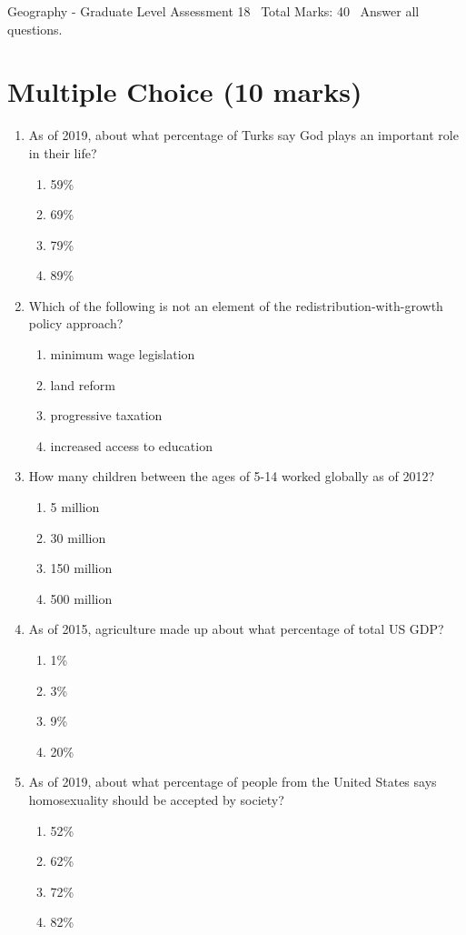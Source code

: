 \documentclass[12pt]{article}
\begin{document}
\begin{center}
Geography - Graduate Level Assessment 18 \
Total Marks: 40 \
Answer all questions.
\end{center}

\section*{Multiple Choice (10 marks)}
\begin{enumerate}[label=\arabic*.]
\item As of 2019, about what percentage of Turks say God plays an important role in their life?
\begin{enumerate}[label=(\alph*)]
    \item 59\%
    \item 69\%
    \item 79\%
    \item 89\%
\end{enumerate}
\item Which of the following is not an element of the redistribution-with-growth policy approach?
\begin{enumerate}[label=(\alph*)]
    \item minimum wage legislation
    \item land reform
    \item progressive taxation
    \item increased access to education
\end{enumerate}
\item How many children between the ages of 5-14 worked globally as of 2012?
\begin{enumerate}[label=(\alph*)]
    \item 5 million
    \item 30 million
    \item 150 million
    \item 500 million
\end{enumerate}
\item As of 2015, agriculture made up about what percentage of total US GDP?
\begin{enumerate}[label=(\alph*)]
    \item 1\%
    \item 3\%
    \item 9\%
    \item 20\%
\end{enumerate}
\item As of 2019, about what percentage of people from the United States says homosexuality should be accepted by society?
\begin{enumerate}[label=(\alph*)]
    \item 52\%
    \item 62\%
    \item 72\%
    \item 82\%
\end{enumerate}
\end{enumerate}
\end{document}
